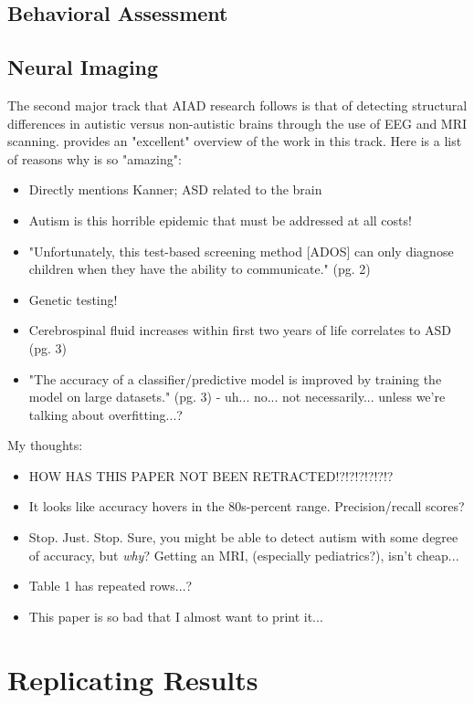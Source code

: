 \documentclass[letterpaper]{article}
\begin{document}
\subsection{Behavioral Assessment}

\subsection{Neural Imaging}
The second major track that AIAD research follows is that of detecting structural differences in autistic versus non-autistic brains through the use of EEG and MRI scanning. \cite{mri} provides an "excellent" overview of the work in this track. Here is a list of reasons why \cite{mri} is so "amazing":
\begin{itemize}
    \item Directly mentions Kanner; ASD related to the brain
    \item Autism is this horrible epidemic that must be addressed at all costs!
    \item "Unfortunately, this test-based screening method [ADOS] can only diagnose children when they have the ability to communicate." (pg. 2)
    \item Genetic testing!
    \item Cerebrospinal fluid increases within first two years of life correlates to ASD (pg. 3)
    \item "The accuracy of a classifier/predictive model is improved by training the model on large datasets." (pg. 3) - uh... no... not necessarily... unless we're talking about overfitting...?
\end{itemize}

My thoughts:
\begin{itemize}
    \item HOW HAS THIS PAPER NOT BEEN RETRACTED!?!?!?!?!?!?
    \item It looks like accuracy hovers in the 80s-percent range. Precision/recall scores?
    \item Stop. Just. Stop. Sure, you might be able to detect autism with some degree of accuracy, but \textit{why}? Getting an MRI, (especially pediatrics?), isn't cheap...
    \item Table 1 has repeated rows...?
    \item This paper is so bad that I almost want to print it...
\end{itemize}

\section{Replicating Results} \label{sec:repres}
\end{document}
